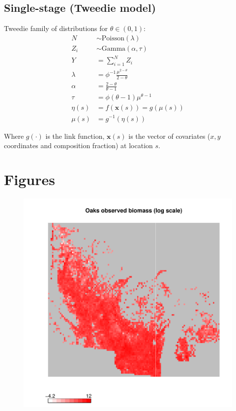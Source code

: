 \documentclass[authoryear, review, 11pt]{elsarticle}
\begin{document}
\subsection{Single-stage (Tweedie model)}
Tweedie family of distributions for $\theta \in (0,1)$:\\
\begin{equation*}
  \begin{split}
    N &\sim \text{Poisson}(\lambda)    \\
    Z_i &\sim \text{Gamma}(\alpha, \tau)    \\
    Y &= \sum\limits_{i=1}^N Z_i \\
    \lambda &= \phi^{-1} \frac{\mu^{2-\theta}}{2-\theta} \\
    \alpha &= \frac{2-\theta}{\theta-1} \\
    \tau &= \phi (\theta - 1) \mu^{\theta - 1}    \\
    \eta(s) &= f\left(\bm{x}(s)\right) = g\left(\mu(s)\right)\\
    \mu(s) &= g^{-1}\left(\eta(s)\right)
  \end{split}
\end{equation*}

Where $g(\cdot)$ is the link function, $\bm{x}(s)$ is the vector of covariates ($x, y$ coordinates and composition fraction) at location $s$.

\section{Figures}
\begin{figure}
	\begin{center}
	\includegraphics[width=5in]{../../figures/Oaks-biomass-observed.pdf}
	\caption{\label{fig:oaks-biomass-observed}}
	\end{center}
\end{figure}
\end{document}
